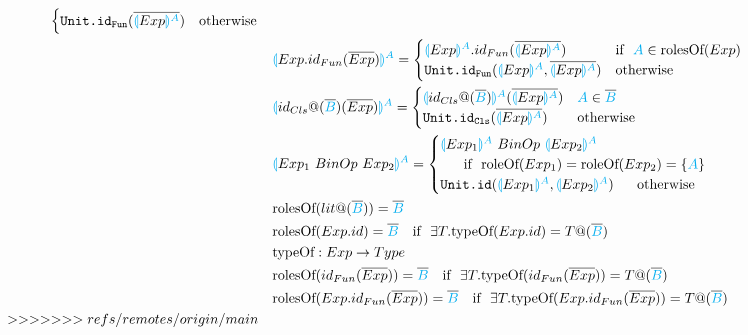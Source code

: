 \documentclass[11pt]{jarticle}
\newcommand{\projection}[2]{{\color{cyan}\llparenthesis}#1{\color{cyan}\rrparenthesis^#2}}
\newcommand{\projection}[2]{{\color{cyan}\llparenthesis}#1{\color{cyan}\rrparenthesis^#2}}
\begin{document}
\begin{alignat*}{2}
\begin{cases}
    \texttt{Unit.id}_\texttt{Fun}(\overline{\projection{Exp}{A}}) &\color{black} \text{otherwise}
  \end{cases}\\
  &&&\projection{Exp.id_{Fun}(\overline{Exp})}{A}=
  \begin{cases}
    \projection{Exp}{A}.id_{Fun}(\overline{\projection{Exp}{A}}) &\text{if}~~ \color{cyan}A \color{black} \in \text{rolesOf}(Exp)\\
    \texttt{Unit.id}_\texttt{Fun}(\projection{Exp}{A}\color{black},\overline{\projection{Exp}{A}}) &\color{black} \text{otherwise}
  \end{cases}\\
  &&&\projection{id_{Cls}@(\overline{\color{cyan}B}\color{black})(\overline{Exp})}{A}=
  \begin{cases}
    \projection{id_{Cls}@(\overline{\color{cyan}B})}{A}(\overline{\projection{Exp}{A}}\color{black}) & \color{cyan}A \color{black} \in \overline{\color{cyan}B}\\
    \texttt{Unit.id}_\texttt{Cls}(\overline{\projection{Exp}{A}}) &\text{otherwise}
  \end{cases}\\
  &&&\projection{Exp_1~BinOp~Exp_2}{A}=
  \begin{cases}
    \projection{Exp_1}{A} ~BinOp~ \projection{Exp_2}{A} \\
    ~~~~~\color{black} \text{if}~~\text{roleOf}(Exp_1) = \text{roleOf}(Exp_2) = \{\color{cyan}A\color{black}\}\\
    \texttt{Unit.id}(\projection{Exp_1}{A}, \projection{Exp_2}{A})  ~~~~~\color{black} \text{otherwise}
  \end{cases}\\
  &&&\text{rolesOf}(lit@(\overline{\color{cyan}B})) = {\overline{\color{cyan}B}}\\
  &&&\text{rolesOf}(Exp.id) = \overline{\color{cyan}B}~~~\text{if}~~\exists T.\text{typeOf}(Exp.id) = T@(\overline{\color{cyan}B})\\
  &&&\text{typeOf}:Exp \rightarrow Type\\
  &&&\text{rolesOf}(id_{Fun}(\overline{Exp})) = \overline{\color{cyan}B}~~~\text{if}~~\exists T.\text{typeOf}(id_{Fun}(\overline{Exp})) = T@(\overline{\color{cyan}B})\\
  &&&\text{rolesOf}(Exp.id_{Fun}(\overline{Exp})) = \overline{\color{cyan}B}~~~\text{if}~~\exists T.\text{typeOf}(Exp.id_{Fun}(\overline{Exp})) = T@(\overline{\color{cyan}B})\\
>>>>>>> refs/remotes/origin/main
\end{alignat*}
\end{document}
